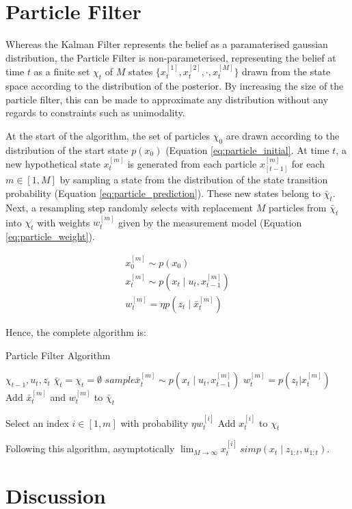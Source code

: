 \documentclass[english]{article}
\begin{document}
\section*{Particle Filter}

Whereas the Kalman Filter represents the belief as a paramaterised gaussian distribution, the Particle Filter is non-parameterised, representing the belief at time $t$ as a finite set $\chi_t$ of $M$ states $\{x^{[1]}_t, x^{[2]}_t, \cdot , x^{[M]}_t\}$ drawn from the state space according to the distribution of the posterior. By increasing the size of the particle filter, this can be made to approximate any distribution without any regards to constraints such as unimodality.

At the start of the algorithm, the set of particles $\chi_0$ are drawn according to the distribution of the start state $p(x_0)$ (Equation \ref{eq:particle_initial}. At time $t$, a new hypothetical state $x^{[m]}_t$ is generated from each particle $x^{[m]}_{[t-1]}$ for each $m \in [1,M]$ by sampling a state from the distribution of the state transition probability (Equation \ref{eq:particle_prediction}). These new states belong to $\bar{\chi}_t$. Next, a resampling step randomly selects with replacement $M$ particles from $\bar{\chi}_t$ into $\chi_t$ with weights $w^{[m]}_t$ given by the measurement model (Equation \ref{eq:particle_weight}).

\begin {align}
  x^{[m]}_0 \sim  p(x_0) \label{eq:particle_initial}\\
  x^{[m]}_t \sim p(x_t \mid u_t,x^{[m]}_{t-1}) \label{eq:particle_prediction} \\
  w^{[m]}_t = \eta p(z_t \mid \bar{x}^{[m]}_t) \label{eq:particle_weight}
\end {align}

Hence, the complete algorithm is:
\begin{algorithm}
\caption{Particle Filter Algorithm}
\label{alg:particla}
\begin{algorithmic}
	\REQUIRE $\chi_{t-1}, u_t, z_t$
        \STATE $\bar{\chi}_t = \chi_t = \emptyset$
        \STATE $sample \bar{x}^{[m]}_t \sim p(x_t \mid u_t,x^{[m]}_{t-1})$
        \STATE $w^{[m]}_t = p(z_t | x^{[m]}_t)$
        \STATE Add $\bar{x}^{[m]}_t$ and $w^{[m]}_t$ to $\bar{\chi}_t$
        \ENDFOR

        \STATE Select an index $i \in [1,m]$ with probability $\eta w^{[i]}_t$
        \STATE Add $x^{[i]}_t$ to $\chi_t$
        \ENDFOR

\end{algorithmic}
\end{algorithm}


Following this algorithm, asymptotically $\lim_{M \to \infty} x^{[i]}_t \ sim p(x_t \mid z_{1:t}, u_{1:t})$.



\section*{Discussion}



\end{document}
